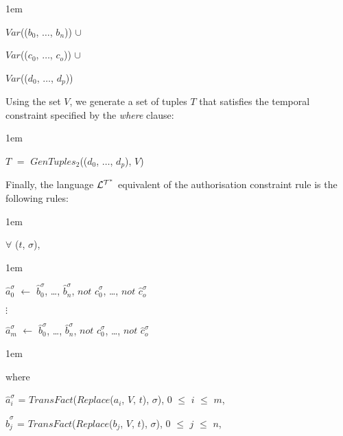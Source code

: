 \documentclass[11pt]{report}
\newenvironment{vquote}
{
  \begin{list}{}{\leftmargin 1em}\item[]
}
{
  \end{list}
}
\begin{document}
\begin{itemize}
\begin{vquote}
                \hspace{1em}
                $Var$(($b_0$, $\ldots$, $b_n$)) $\cup$

                \hspace{1em}
                $Var$(($c_0$, $\ldots$, $c_o$)) $\cup$

                \hspace{1em}
                $Var$(($d_0$, $\ldots$, $d_p$))
              \end{vquote}

              \noindent
              Using the set $V$, we generate a set of tuples $T$ that satisfies
              the temporal constraint specified by the {\em where} clause:

              \begin{vquote}
                $T$ $=$ $GenTuples_2$(($d_0$, $\ldots$, $d_p$), $V$)
              \end{vquote}

              \noindent
              Finally, the language ${\cal L^{T^*}}$ equivalent of the
              authorisation constraint rule is the following rules:

              \begin{vquote}
                $\forall$ ($t$, $\sigma$),
              \end{vquote}

              \begin{vquote}
                $\hat{a}^{\sigma}_{0}$ $\leftarrow$
                $\hat{b}^{\sigma}_{0}$, \ldots, $\hat{b}^{\sigma}_{n}$,
                $not$ $\hat{c}^{\sigma}_{0}$, \ldots, $not$ $\hat{c}^{\sigma}_{o}$

                $\vdots$

                $\hat{a}^{\sigma}_{m}$ $\leftarrow$
                $\hat{b}^{\sigma}_{0}$, \ldots, $\hat{b}^{\sigma}_{n}$,
                $not$ $\hat{c}^{\sigma}_{0}$, \ldots, $not$ $\hat{c}^{\sigma}_{o}$
              \end{vquote}

              \begin{vquote}
                where

                \hspace{1em}
                $\hat{a}^{\sigma}_{i}$ = $TransFact$($Replace$($a_{i}$, $V$, $t$), $\sigma$),
                $0$ $\leq$ $i$ $\leq$ $m$,
    
                \hspace{1em}
                $\hat{b}^{\sigma}_{j}$ = $TransFact$($Replace$($b_{j}$, $V$, $t$), $\sigma$),
                $0$ $\leq$ $j$ $\leq$ $n$,
    

\end{vquote}
\end{itemize}
\end{document}
